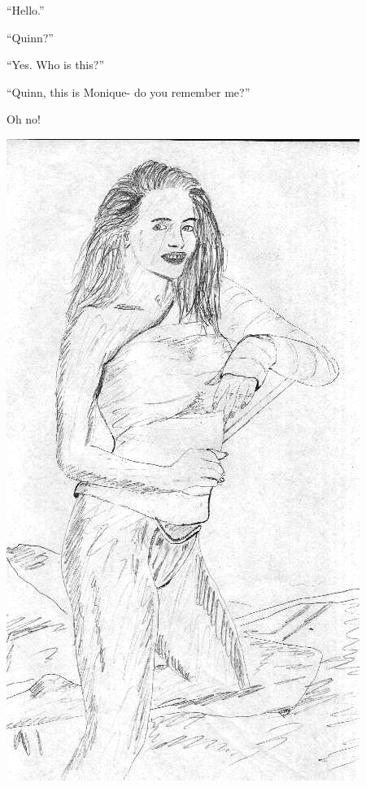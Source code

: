 ``Hello.''

``Quinn?''

``Yes. Who is this?''

``Quinn, this is Monique- do you remember me?''

Oh no!

\begin{center}
\includegraphics{images/kicks09.jpg}
\end{center}
